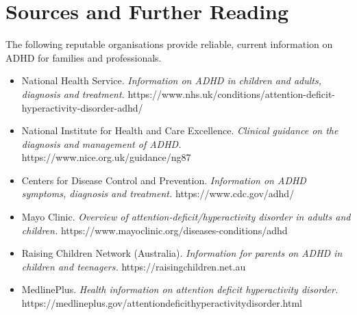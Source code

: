 \section*{Sources and Further Reading}
The following reputable organisations provide reliable, current information on ADHD for families and professionals.

\begin{itemize}
    \item National Health Service. \textit{Information on ADHD in children and adults, diagnosis and treatment.} https://www.nhs.uk/conditions/attention-deficit-hyperactivity-disorder-adhd/
    \item National Institute for Health and Care Excellence. \textit{Clinical guidance on the diagnosis and management of ADHD.} https://www.nice.org.uk/guidance/ng87
    \item Centers for Disease Control and Prevention. \textit{Information on ADHD symptoms, diagnosis and treatment.} https://www.cdc.gov/adhd/
    \item Mayo Clinic. \textit{Overview of attention-deficit/hyperactivity disorder in adults and children.} https://www.mayoclinic.org/diseases-conditions/adhd
    \item Raising Children Network (Australia). \textit{Information for parents on ADHD in children and teenagers.} https://raisingchildren.net.au
    \item MedlinePlus. \textit{Health information on attention deficit hyperactivity disorder.} https://medlineplus.gov/attentiondeficithyperactivitydisorder.html
\end{itemize}
